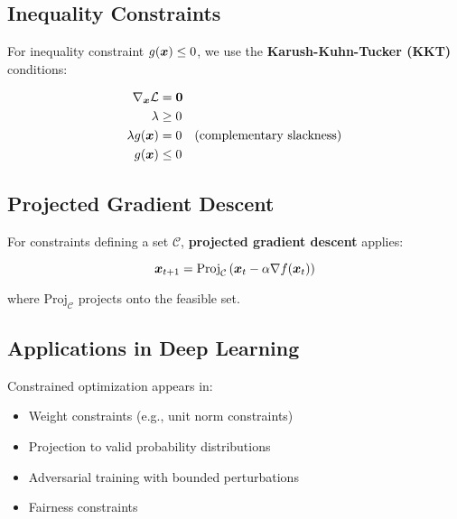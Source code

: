 \subsection{Inequality Constraints}

For inequality constraint $g(\boldsymbol{x}) \leq 0$, we use the \textbf{Karush-Kuhn-Tucker (KKT)} conditions:

\begin{align}
\nabla_{\boldsymbol{x}} \mathcal{L} &= \boldsymbol{0} \\
\lambda &\geq 0 \\
\lambda g(\boldsymbol{x}) &= 0 \quad \text{(complementary slackness)} \\
g(\boldsymbol{x}) &\leq 0
\end{align}

\subsection{Projected Gradient Descent}

For constraints defining a set $\mathcal{C}$, \textbf{projected gradient descent} applies:

\begin{equation}
\boldsymbol{x}_{t+1} = \text{Proj}_{\mathcal{C}}\left(\boldsymbol{x}_t - \alpha \nabla f(\boldsymbol{x}_t)\right)
\end{equation}

where $\text{Proj}_{\mathcal{C}}$ projects onto the feasible set.

\subsection{Applications in Deep Learning}

Constrained optimization appears in:
\begin{itemize}
    \item Weight constraints (e.g., unit norm constraints)
    \item Projection to valid probability distributions
    \item Adversarial training with bounded perturbations
    \item Fairness constraints
\end{itemize}
